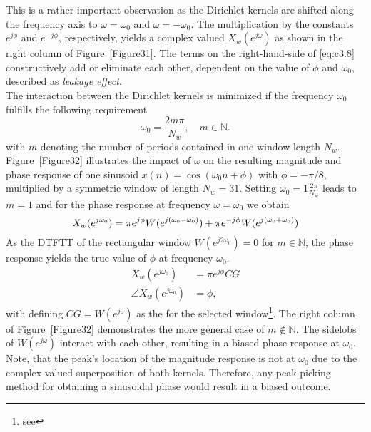 This is a rather important observation as the Dirichlet kernels are shifted along the frequency axis to $\omega=\omega_0$ and $\omega=-\omega_0$. The multiplication by the constants $e^{j\phi}$ and $e^{-j\phi}$, respectively, yields a complex valued $X_w(e^{j\omega})$ as shown in the right column of Figure~\ref{Figure31}. The terms on the right-hand-side of \eqref{eq:c3.8} constructively add or eliminate each other, dependent on the value of $\phi$ and $\omega_0$, described as \emph{leakage effect}.\\

\noindent The interaction between the Dirichlet kernels is minimized if the frequency $\omega_0$ fulfills the following requirement
\begin{equation}\label{eq:c3.9}
\omega_0=\frac{2{m}\pi}{N_w}, \quad m\in\mathbb{N}.
\end{equation}
with $m$ denoting the number of periods contained in one window length $N_w$. Figure~\ref{Figure32} illustrates the impact of $\omega$ on the resulting magnitude and phase response of one sinusoid $x(n)=\cos(\omega_0 n+\phi)$ with $\phi=-\pi/8$, multiplied by a symmetric window of length $N_w=31$. Setting $\omega_0=1\frac{2\pi}{N_w}$ leads to $m=1$ and for the phase response at frequency $\omega=\omega_0$ we obtain
\begin{equation}
X_w(e^{j\omega_0})=\pi e^{j\phi}W(e^{j(\omega_0-\omega_0)})+\pi e^{-j\phi}W(e^{j(\omega_0+\omega_0)})\\
\end{equation}
As the \gls{DTFT}T of the rectangular window $W(e^{j2\omega_0})=0$ for $m\in\mathbb{N}$, the phase response yields the true value of $\phi$ at frequency $\omega_0$.
\begin{align}\label{eq:c3.10}
	X_w(e^{j\omega_0})&=\pi e^{j\phi} CG\\
	\angle X_w(e^{j\omega_0})&=\phi,
\end{align}
with defining $CG=W(e^{j0})$ as the  for the selected window\footnote{see }. The right column of Figure~\ref{Figure32} demonstrates the more general case of $m\notin\mathbb{N}$. The sidelobs of $W(e^{j\omega})$ interact with each other, resulting in a biased phase response at $\omega_0$. Note, that the peak's location of the magnitude response is not at $\omega_0$ due to the complex-valued superposition of both kernels. Therefore, any peak-picking method for obtaining a sinusoidal phase would result in a biased outcome.\\

